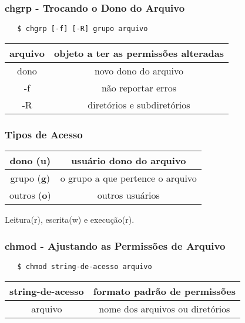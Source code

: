 \documentclass{beamer}
\begin{document}
\begin{frame}[fragile]
   \frametitle{chgrp - Trocando o Dono do Arquivo}
   \begin{verbatim}
   $ chgrp [-f] [-R] grupo arquivo
   \end{verbatim}
   \begin{table}
      \begin{tabular}{ c | c }
         arquivo & objeto a ter as permissões alteradas \\
         \hline 
         dono & novo dono do arquivo \\ 
         \hline
         -f & não reportar erros \\
         \hline
         -R & diretórios e subdiretórios \\
      \end{tabular}
   \end{table}
\end{frame}

\begin{frame}
   \frametitle{Tipos de Acesso}
   \begin{table}
      \begin{tabular}{ c | c }
         dono (\textbf{u}) & usuário dono do arquivo \\
         \hline 
         grupo (\textbf{g}) & o grupo a que pertence o arquivo \\ 
         \hline
         outros (\textbf{o}) & outros usuários \\
      \end{tabular}
   \end{table}
   \begin{center}
   Leitura(r), escrita(w) e execução(r).
   \end{center}
\end{frame}

\begin{frame}[fragile]
   \frametitle{chmod - Ajustando as Permissões de Arquivo}
   \begin{verbatim}
   $ chmod string-de-acesso arquivo
   \end{verbatim}
   \begin{table}
      \begin{tabular}{ c | c }
         string-de-acesso & formato padrão de permissões \\
         \hline 
         arquivo & nome dos arquivos ou diretórios\\ 
      \end{tabular}
   \end{table}
\end{frame}
\end{document}
